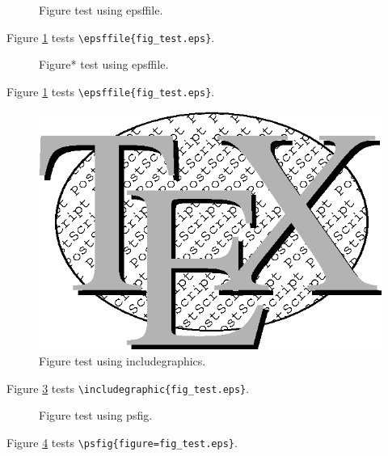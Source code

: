 \documentclass{article}
\begin{document}
\begin{figure}
\caption{Figure test using epsffile.} 
\label{figure1}
\end{figure}

Figure \ref{figure1} tests \verb#\epsffile{fig_test.eps}#.

\begin{figure}
\caption{Figure* test using epsffile.} 
\label{figure1a}
\end{figure}

Figure \ref{figure1} tests \verb#\epsffile{fig_test.eps}#.

\begin{figure}
\includegraphics{fig_test.eps}
\caption{Figure test using includegraphics.} 
\label{figure2}
\end{figure}

Figure \ref{figure2} tests \verb#\includegraphic{fig_test.eps}#.

\begin{figure}
\caption{Figure test using psfig.} 
\label{figure3}
\end{figure}

Figure \ref{figure3} tests \verb#\psfig{figure=fig_test.eps}#.
\end{document}

